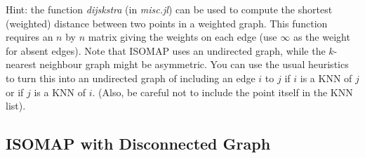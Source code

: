 \documentclass{article}
\begin{document}
Hint: the function \emph{dijskstra} (in \emph{misc.jl}) can be used to compute the shortest (weighted) distance between two points in a weighted graph. This function requires an $n$ by $n$ matrix giving the weights on each edge (use $\infty$ as the weight for absent edges). Note that ISOMAP uses an undirected graph, while the $k$-nearest neighbour graph might be asymmetric. You can use the usual heuristics to turn this into an undirected graph of including an edge $i$ to $j$ if $i$ is a KNN of $j$ or if $j$ is a KNN of $i$. (Also, be careful not to include the point itself in the KNN list).




\subsection{ISOMAP with Disconnected Graph}
\end{document}

